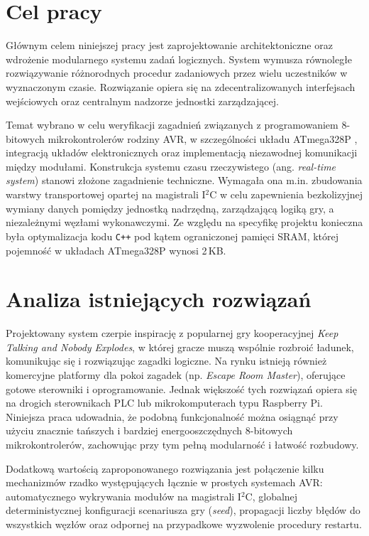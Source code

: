\documentclass{SGGW-thesis}
\begin{document}
\section{Cel pracy}
Głównym celem niniejszej pracy jest zaprojektowanie architektoniczne oraz wdrożenie modularnego systemu zadań logicznych. System wymusza równoległe rozwiązywanie różnorodnych procedur zadaniowych przez wielu uczestników w wyznaczonym czasie. Rozwiązanie opiera się na zdecentralizowanych interfejsach wejściowych oraz centralnym nadzorze jednostki zarządzającej.

Temat wybrano w celu weryfikacji zagadnień związanych z programowaniem 8-bitowych mikrokontrolerów rodziny AVR, w szczególności układu ATmega328P \cite{atmega328p_datasheet}, integracją układów elektronicznych oraz implementacją niezawodnej komunikacji między modułami. Konstrukcja systemu czasu rzeczywistego (ang. \textit{real-time system}) stanowi złożone zagadnienie techniczne. Wymagała ona m.in. zbudowania warstwy transportowej opartej na magistrali I$^2$C w celu zapewnienia bezkolizyjnej wymiany danych pomiędzy jednostką nadrzędną, zarządzającą logiką gry, a niezależnymi węzłami wykonawczymi. Ze względu na specyfikę projektu konieczna była optymalizacja kodu \texttt{C++} pod kątem ograniczonej pamięci SRAM, której pojemność w układach ATmega328P wynosi 2\,KB.

\section{Analiza istniejących rozwiązań}
Projektowany system czerpie inspirację z popularnej gry kooperacyjnej \textit{Keep Talking and Nobody Explodes}, w której gracze muszą wspólnie rozbroić ładunek, komunikując się i rozwiązując zagadki logiczne. Na rynku istnieją również komercyjne platformy dla pokoi zagadek (np. \textit{Escape Room Master}), oferujące gotowe sterowniki i oprogramowanie. Jednak większość tych rozwiązań opiera się na drogich sterownikach PLC lub mikrokomputerach typu Raspberry Pi. Niniejsza praca udowadnia, że podobną funkcjonalność można osiągnąć przy użyciu znacznie tańszych i bardziej energooszczędnych 8-bitowych mikrokontrolerów, zachowując przy tym pełną modularność i łatwość rozbudowy.

Dodatkową wartością zaproponowanego rozwiązania jest połączenie kilku mechanizmów rzadko występujących łącznie w prostych systemach AVR: automatycznego wykrywania modułów na magistrali I$^2$C, globalnej deterministycznej konfiguracji scenariusza gry (\textit{seed}), propagacji liczby błędów do wszystkich węzłów oraz odpornej na przypadkowe wyzwolenie procedury restartu.
\end{document}
